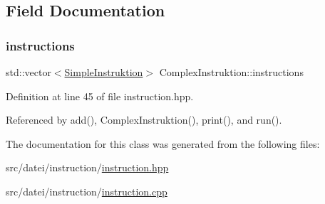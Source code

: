 \subsection{Field Documentation}
\mbox{\label{class_complex_instruktion_af8a7ed862ee24675b75750a470dcf22a}} 
\subsubsection{\texorpdfstring{instructions}{instructions}}
{\footnotesize\ttfamily std\+::vector$<$\mbox{\hyperlink{class_simple_instruktion}{Simple\+Instruktion}}$>$ Complex\+Instruktion\+::instructions\hspace{0.3cm}{\ttfamily [private]}}



Definition at line 45 of file instruction.\+hpp.



Referenced by add(), Complex\+Instruktion(), print(), and run().



The documentation for this class was generated from the following files\+:\begin{DoxyCompactItemize}
\item 
src/datei/instruction/\mbox{\hyperlink{instruction_8hpp}{instruction.\+hpp}}\item 
src/datei/instruction/\mbox{\hyperlink{instruction_8cpp}{instruction.\+cpp}}\end{DoxyCompactItemize}
